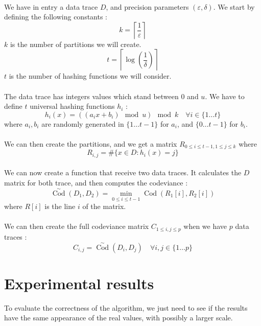 \documentclass[a4paper]{article}%
\DeclareMathOperator{\Cod}{Cod}
\newcommand{\CodSk}{\overset{\sim}{\Cod}}
\begin{document}
\paragraph{}We have in entry a data trace $D$, and precision parameters $(\varepsilon, \delta)$. We start by defining the following constants :
	\[ k =\left\lceil \frac{1}{\varepsilon} \right\rceil \]
$k$ is the number of partitions we will create.
	\[ t = \left\lceil \log(\frac{1}{\delta}) \right\rceil \]
$t$ is the number of hashing functions we will consider.
	
\paragraph{}The data trace has integers values which stand between $0$ and $u$. We have to define $t$ universal hashing functions $h_i$ :
	\[ h_i(x) = ((a_ix+b_i) \mod u) \mod k \quad \forall i \in \lbrace 1 \ldots t \rbrace \]
where $a_i, b_i$ are randomly generated in $\lbrace 1 \dots t-1 \rbrace$ for $a_i$, and $\lbrace 0 \ldots t-1 \rbrace$ for $b_i$.

\paragraph{}We can then create the partitions, and we get a matrix $R_{0 \leq i \leq t-1, 1 \leq j \leq k}$ where 
 	\[ R_{i,j} = \# \lbrace x \in D : h_i(x) = j \rbrace \]
 	
\paragraph{}We can now create a function that receive two data traces. It calculates the $D$ matrix for both trace, and then computes the codeviance :
	\[ \CodSk(D_1, D_2) = \underset{0 \leq i \leq t-1}{\min} \Cod(R_1[i], R_2[i]) \]
where $R[i]$ is the line $i$ of the matrix.

\paragraph{}We can then create the full codeviance matrix $C_{1 \leq i,j \leq p}$ when we have $p$ data traces :
	\[ C_{i,j} = \CodSk(D_i, D_j) \quad \forall i,j \in \lbrace 1 \ldots p \rbrace \]







\section{Experimental results}
To evaluate the correctness of the algorithm, we just need to see if the results have the same appearance of the real values, with possibly a larger scale.
\end{document}
